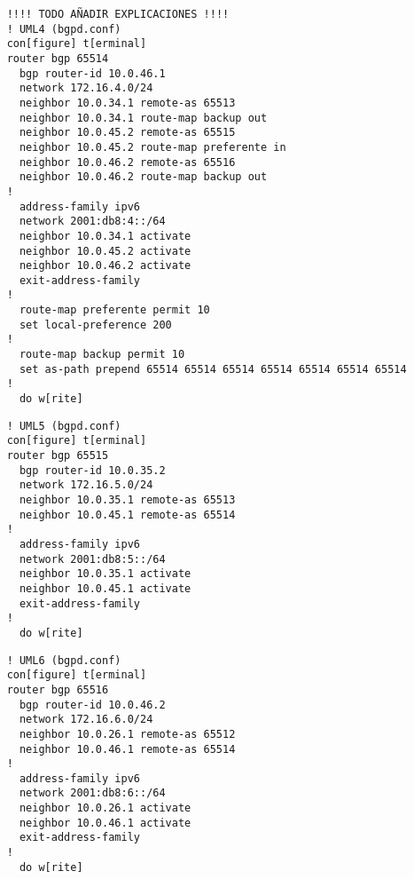   \begin{verbatim}
    !!!! TODO AÑADIR EXPLICACIONES !!!!
    ! UML4 (bgpd.conf)
    con[figure] t[erminal]
    router bgp 65514
      bgp router-id 10.0.46.1
      network 172.16.4.0/24
      neighbor 10.0.34.1 remote-as 65513
      neighbor 10.0.34.1 route-map backup out
      neighbor 10.0.45.2 remote-as 65515
      neighbor 10.0.45.2 route-map preferente in
      neighbor 10.0.46.2 remote-as 65516
      neighbor 10.0.46.2 route-map backup out
    !
      address-family ipv6
      network 2001:db8:4::/64
      neighbor 10.0.34.1 activate
      neighbor 10.0.45.2 activate
      neighbor 10.0.46.2 activate
      exit-address-family
    !
      route-map preferente permit 10
      set local-preference 200
    !
      route-map backup permit 10
      set as-path prepend 65514 65514 65514 65514 65514 65514 65514
    !
      do w[rite]
  \end{verbatim}
  
  \begin{verbatim}
    ! UML5 (bgpd.conf)
    con[figure] t[erminal]
    router bgp 65515
      bgp router-id 10.0.35.2
      network 172.16.5.0/24
      neighbor 10.0.35.1 remote-as 65513
      neighbor 10.0.45.1 remote-as 65514
    !
      address-family ipv6
      network 2001:db8:5::/64
      neighbor 10.0.35.1 activate
      neighbor 10.0.45.1 activate
      exit-address-family
    !
      do w[rite]
  \end{verbatim}
  
  \begin{verbatim}
    ! UML6 (bgpd.conf)
    con[figure] t[erminal]
    router bgp 65516
      bgp router-id 10.0.46.2
      network 172.16.6.0/24
      neighbor 10.0.26.1 remote-as 65512
      neighbor 10.0.46.1 remote-as 65514
    !
      address-family ipv6
      network 2001:db8:6::/64
      neighbor 10.0.26.1 activate
      neighbor 10.0.46.1 activate
      exit-address-family
    !
      do w[rite]
  \end{verbatim}
